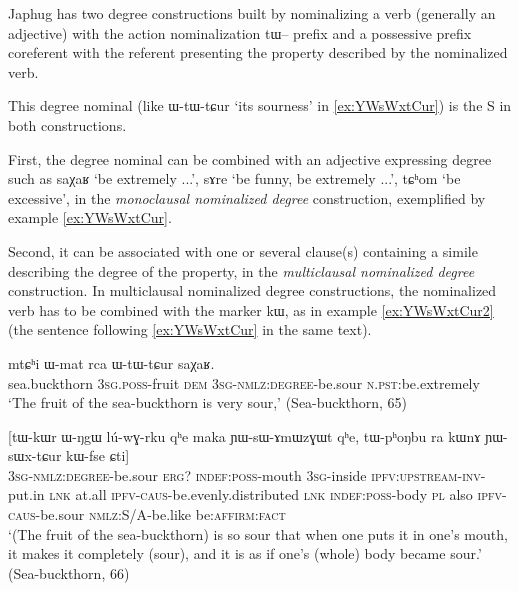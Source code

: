 \documentclass[oldfontcommands,oneside,a4paper,11pt]{article}
\newcommand{\ipa}[1]{{\phon #1}} %
\begin{document}
 
Japhug has two degree constructions built by nominalizing a verb (generally an adjective)  with the action nominalization \ipa{tɯ--} prefix and a possessive prefix coreferent with the referent presenting the property described by the nominalized verb. 

This degree nominal (like \ipa{ɯ-tɯ-tɕur} `its sourness' in \ref{ex:YWsWxtCur}) is the S in both constructions.

First, the degree nominal can be  combined with an adjective expressing degree such as \ipa{saχaʁ} `be extremely ...', \ipa{sɤre} `be funny, be extremely ...', \ipa{tɕʰom} `be excessive', in the \textit{monoclausal nominalized degree} construction, exemplified by example \ref{ex:YWsWxtCur}.

Second, it can be associated  with one or several  clause(s) containing a simile describing the degree of the property, in the \textit{multiclausal nominalized degree} construction. In multiclausal nominalized degree constructions, the nominalized verb has to be combined with the marker \ipa{kɯ}, as in   example \ref{ex:YWsWxtCur2} (the sentence following  \ref{ex:YWsWxtCur} in the same text).



\begin{exe}
\ex \label{ex:YWsWxtCur}
\gll 
\ipa{mtɕʰi}  	\ipa{ɯ-mat}  	\ipa{rca}  	\ipa{ɯ-tɯ-tɕur}  	\ipa{saχaʁ.}  	   \\
sea.buckthorn \textsc{3sg.poss}-fruit \textsc{dem} \textsc{3sg-nmlz:degree}-be.sour \textsc{n.pst}:be.extremely   \\
\glt `The fruit of the sea-buckthorn is very sour,' (Sea-buckthorn, 65)
\end{exe}

\begin{exe}
\ex \label{ex:YWsWxtCur2}
\gll 
 	[\ipa{ɯ-tɯ-tɕur}]  	\ipa{\textbf{kɯ}}  	[\ipa{tɯ-kɯr}  	\ipa{ɯ-ŋgɯ}  	\ipa{lú-wɣ-rku}  	\ipa{qʰe}  	\ipa{maka}  	\ipa{ɲɯ-sɯ-ɤmɯzɣɯt}  	\ipa{qʰe,}  	\ipa{tɯ-pʰoŋbu}  	\ipa{ra}  	\ipa{kɯnɤ}  	\ipa{ɲɯ-sɯx-tɕur}  	\ipa{kɯ-fse}  	\ipa{ɕti}]  \\
  \textsc{3sg-nmlz:degree}-be.sour \textsc{erg?} \textsc{indef:poss}-mouth \textsc{3sg}-inside \textsc{ipfv:upstream-inv}-put.in \textsc{lnk} at.all \textsc{ipfv-caus}-be.evenly.distributed \textsc{lnk} \textsc{indef:poss}-body \textsc{pl} also \textsc{ipfv-caus}-be.sour \textsc{nmlz:S/A}-be.like be:\textsc{affirm}:\textsc{fact} \\
\glt `(The fruit of the sea-buckthorn) is so sour that when one puts it in one's mouth, it makes it completely (sour), and it is as if one's (whole) body became sour.' (Sea-buckthorn, 66)
\end{exe}
\end{document}
